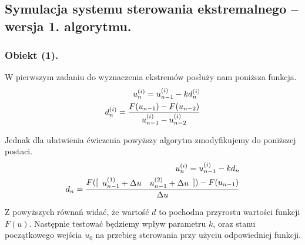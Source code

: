 \documentclass[a4paper,10pt]{article}
\begin{document}
\subsection{Symulacja systemu sterowania ekstremalnego – wersja 1. algorytmu.}

\subsubsection{Obiekt (1).}
W pierwszym zadaniu do wyznaczenia ekstremów posłuży nam poniższa funkcja.
\begin{eqnarray}
	u_n^{(i)} = u_{n-1}^{(i)}-kd_n^{(i)}\\
	d_n^{(i)} = {F(u_{n-1}) - F(u_{n-2}) \over u_{n-1}^{(i)} - u_{n-2}^{(i)}}
\end{eqnarray}

Jednak dla ułatwienia ćwiczenia powyższy algorytm zmodyfikujemy do poniższej postaci.
\begin{eqnarray}
	u_n^{(i)} = u_{n-1}^{(i)}-kd_n\\
	d_n = {F([\begin{array}{ll} u_{n-1}^{(1)} + \Delta u & u_{n-1}^{(2)} + \Delta u\end{array}]) - F(u_{n-1}) \over \Delta u}
\end{eqnarray}

Z powyższych równań widać, że wartość $d$ to pochodna przyrostu wartości funkcji $F(u)$.
Następnie testować będziemy wpływ parametru $k$, oraz stanu początkowego wejścia $u_0$ na przebieg sterowania przy użyciu odpowiedniej funkcji.

\end{document}
